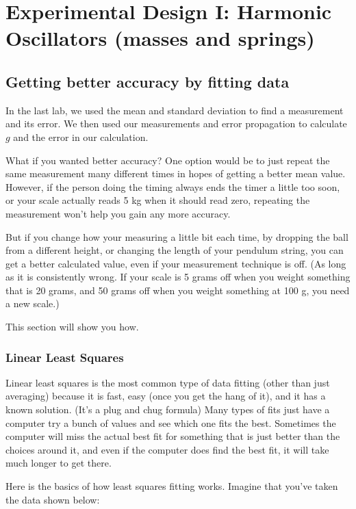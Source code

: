 \documentclass[twoside,11pt,ShortChapTitles]{BYUTextbook}
\begin{document}
\chapter[Experimental Design I]{Experimental Design I: Harmonic Oscillators (masses and springs)\label{Experimental Design}}
\section{Getting better accuracy by fitting data}
In the last lab, we used the mean and standard deviation to find a measurement and its error.  We then used our measurements and error propagation to calculate $g$ and the error in our calculation.

What if you wanted better accuracy?  One option would be to just repeat the same measurement many different times in hopes of getting a better mean value.  However, if the person doing the timing always ends the timer a little too soon, or your scale actually reads 5 kg when it should read zero, repeating the measurement won't help you gain any more accuracy.

But if you change how your measuring a little bit each time, by dropping the ball from a different height, or changing the length of your pendulum string, you can get a better calculated value, even if your measurement technique is off.  (As long as it is consistently wrong.  If your scale is 5 grams off when you weight something that is 20 grams, and 50 grams off when you weight something at 100 g, you need a new scale.)

This section will show you how.

\subsection{Linear Least Squares}

Linear least squares is the most common type of data fitting (other than just averaging) because it is fast, easy (once you get the hang of it), and it has a known solution. (It's a plug and chug formula)
Many types of fits just have a computer try a bunch of values and see which one fits the best.  Sometimes the computer will miss the actual best fit for something that is just better than the choices around it, and even if the computer does find the best fit, it will take much longer to get there.

Here is the basics of how least squares fitting works.  Imagine that you've taken the data shown below:
\end{document}
